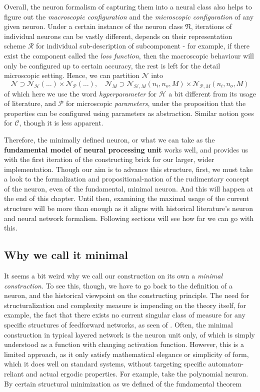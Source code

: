 Overall, the neuron formalism of capturing them into a neural class also helps to figure out the \textit{macroscopic configuration} and the \textit{microscopic configuration} of any given neuron. Under a certain instance of the neuron class $\mathfrak{N}$, iterations of individual neurons can be vastly different, depends on their representation scheme $\mathcal{R}$ for individual sub-description of subcomponent - for example, if there exist the component called the \textit{loss function}, then the macroscopic behaviour will only be configured up to certain accuracy, the rest is left for the detail microscopic setting. Hence, we can partition $\mathcal{N}$ into $$\mathcal{N}\supset \mathcal{N}_{\mathcal{H}}(\dots)\times \mathcal{N}_{\mathcal{P}}(\dots), \quad \mathcal{N}_{M}\supset \mathcal{N}_{\mathcal{H},M}(n_{i},n_{o},M)\times \mathcal{N}_{\mathcal{P},M}(n_{i},n_{o},M)$$
of which here we use the word \textit{hyperparameter} for $\mathcal{H}$ a bit different from its usage of literature, and $\mathcal{P}$ for microscopic \textit{parameters}, under the proposition that the properties can be configured using parameters as abstraction. Similar notion goes for $\mathcal{C}$, though it is less apparent. 

Therefore, the minimally defined neuron, or what we can take as the \textbf{fundamental model of neural processing unit} works well, and provides us with the first iteration of the constructing brick for our larger, wider implementation. Though our aim is to advance this structure, first, we must take a look to the formalization and propositional-nation of the rudimentary concept of the neuron, even of the fundamental, minimal neuron. And this will happen at the end of this chapter. Until then, examining the maximal usage of the current structure will be more than enough as it aligns with historical literature's neuron and neural network formalism. Following sections will see how far we can go with this. 
\subsection{Why we call it minimal}

It seems a bit weird why we call our construction on its own a \textit{minimal construction}. To see this, though, we have to go back to the definition of a neuron, and the historical viewpoint on the constructing principle. The need for structuralization and complexity measure is impending on the theory itself, for example, the fact that there exists no current singular class of measure for any specific structures of feedforward networks, as seen of \cite{hu_model_2021}. Often, the minimal construction in typical layered network is the neuron unit only, of which is simply understood as a function with changing activation function. However, this is a limited approach, as it only satisfy mathematical elegance or simplicity of form, which it does well on standard systems, without targeting specific automaton-reliant and actual ergodic properties. For example, take the polynomial neuron. By certain structural minimization as we defined of the fundamental theorem

